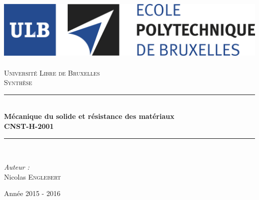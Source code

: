\AddToShipoutPicture*{\BackgroundPic}
\begin{titlepage}
	\begin{center}	
			
		\newcommand{\HRule}{\rule{\linewidth}{0.5mm}}   			            %
		\includegraphics[scale=0.11]{titlepage/logo.jpg}~\\[1cm]				%
			
			\textsc{\LARGE Université Libre de Bruxelles}\\[1.5cm]
			\textsc{\Large Synthèse}\\[0.5cm]
			
			\HRule \\[0.4cm]
			{ \huge \bfseries Mécanique du solide et résistance des matériaux \ \\CNST-H-2001 \\[0.4cm] }
			
			
			\HRule \\[1.5cm]
			\begin{minipage}{0.4\textwidth}
				\begin{flushleft} \large
							
					\emph{Auteur :}\\
					Nicolas \textsc{Englebert}
					
				\end{flushleft}
			\end{minipage}
			\begin{minipage}{0.4\textwidth}
				\begin{flushright} \large
				\end{flushright}
			\end{minipage}
			
			\vfill
			
			{\large Année 2015 - 2016}
			
		\end{center}
	\end{titlepage}